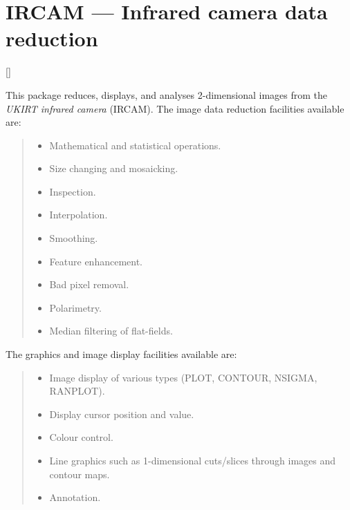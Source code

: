 \newpage

\section{IRCAM --- Infrared camera data reduction} 

\vspace{-11mm}

\hfill []

\vspace{5mm}

This package reduces, displays, and analyses 2-dimensional images from the
{\em UKIRT infrared camera} (IRCAM).
The image data reduction facilities available are:

{\small
\begin{quote}
\begin{itemize}
\item Mathematical and statistical operations.
\item Size changing and mosaicking.
\item Inspection.
\item Interpolation.
\item Smoothing.
\item Feature enhancement.
\item Bad pixel removal.
\item Polarimetry.
\item Median filtering of flat-fields.
\end{itemize}
\end{quote}
}

The graphics and image display facilities available are:

{\small
\begin{quote}
\begin{itemize}
\item Image display of various types (PLOT, CONTOUR, NSIGMA, RANPLOT).
\item Display cursor position and value.
\item Colour control.
\item Line graphics such as 1-dimensional cuts/slices through images and 
 contour maps.
\item Annotation.
\end{itemize}
\end{quote}
}

